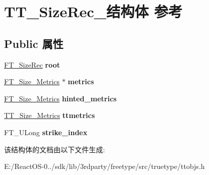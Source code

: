 \hypertarget{struct_t_t___size_rec__}{}\section{T\+T\+\_\+\+Size\+Rec\+\_\+结构体 参考}
\label{struct_t_t___size_rec__}
\subsection*{Public 属性}
\begin{DoxyCompactItemize}
\item 
\mbox{\label{struct_t_t___size_rec___a36e72cb2eeee674cd0b2627b1bc78290}} 
\hyperlink{struct_f_t___size_rec__}{F\+T\+\_\+\+Size\+Rec} {\bfseries root}
\item 
\mbox{\label{struct_t_t___size_rec___a2a811172f2df9d0070e6ecb1873a7a32}} 
\hyperlink{struct_f_t___size___metrics__}{F\+T\+\_\+\+Size\+\_\+\+Metrics} $\ast$ {\bfseries metrics}
\item 
\mbox{\label{struct_t_t___size_rec___a4e7af7971e27aa7e258a29b13d320175}} 
\hyperlink{struct_f_t___size___metrics__}{F\+T\+\_\+\+Size\+\_\+\+Metrics} {\bfseries hinted\+\_\+metrics}
\item 
\mbox{\label{struct_t_t___size_rec___aa2f032928315810cdbfad22217850d16}} 
\hyperlink{struct_t_t___size___metrics__}{T\+T\+\_\+\+Size\+\_\+\+Metrics} {\bfseries ttmetrics}
\item 
\mbox{\label{struct_t_t___size_rec___acea9d3f6b45ce6472a3c804125aa914f}} 
F\+T\+\_\+\+U\+Long {\bfseries strike\+\_\+index}
\end{DoxyCompactItemize}


该结构体的文档由以下文件生成\+:\begin{DoxyCompactItemize}
\item 
E\+:/\+React\+O\+S-\/0../sdk/lib/3rdparty/freetype/src/truetype/ttobjs.\+h\end{DoxyCompactItemize}
